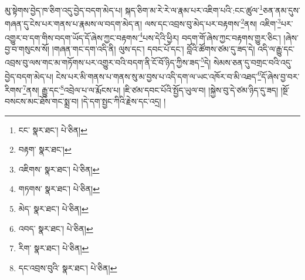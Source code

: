 མུ་སྟེགས་བྱེད་ཁ་ཅིག་འདུ་བྱེད་བདག་མེད་པ། སྐད་ཅིག་མ་རེ་རེ་ལ་རྣམ་པར་འཇིག་པའི་:ངང་ཚུལ་\footnote{ངང་  སྣར་ཐང་།  པེ་ཅིན། }ཅན་ནམ་དུས་གཞན་དུ་ངེས་པར་གནས་པ་རྣམས་ལ་བདག་མེད་ན། ལས་དང་འབྲས་བུ་མེད་པར་བརྟགས་\footnote{བརྟག་  སྣར་ཐང་། }ནས། འཇིག་\footnote{འཇིགས་  སྣར་ཐང་།  པེ་ཅིན། }པར་འགྱུར་བ་དག་གིས་བདག་ཡོད་དོ་ཞེས་ཀྱང་བརྟགས་\footnote{གཏགས་  སྣར་ཐང་།  པེ་ཅིན། }པས་དེའི་ཕྱིར། བདག་གོ་ཞེས་ཀྱང་བརྟགས་གྱུར་ཅིང་། །ཞེས་བྱ་བ་གསུངས་སོ། །གཞན་གང་དག་འདི་ནི། ལུས་དང་། དབང་པོ་དང་། བློའི་ཚོགས་ཙམ་དུ་ཟད་དེ། འདི་ལ་རྒྱུ་དང་འབྲས་བུ་ལས་གང་མ་གཏོགས་པར་འགྱུར་བའི་བདག་ནི་ངོ་བོ་ཉིད་ཀྱིས་ཟད་\footnote{མེད་  སྣར་ཐང་།  པེ་ཅིན། }དེ། སེམས་ཅན་དུ་བགྲང་བའི་འདུ་བྱེད་བདག་མེད་པ། ངེས་པར་མི་གནས་པ་གནས་སུ་མ་བྱས་པ་འདི་དག་ལ་ཡང་འཁོར་བ་མི་འཐད་\footnote{འབད་  སྣར་ཐང་།  པེ་ཅིན། }དོ་ཞེས་བྱ་བར་རིགས་\footnote{རིག་  སྣར་ཐང་།  པེ་ཅིན། }ནས། རྒྱུ་དང་\footnote{དང་འབྲས་བུའི་  སྣར་ཐང་།  པེ་ཅིན། }འབྲེལ་པ་ལ་རྨོངས་པ། །ཇི་ཙམ་དབང་པོའི་སྤྱོད་ཡུལ་བ། །སྐྱེས་བུ་དེ་ཙམ་ཉིད་དུ་ཟད། །སྔོ་བསངས་མང་ཐོས་གང་སྨྲ་བ། །དེ་དག་སྤྱང་ཀིའི་རྗེས་དང་འདྲ། །
